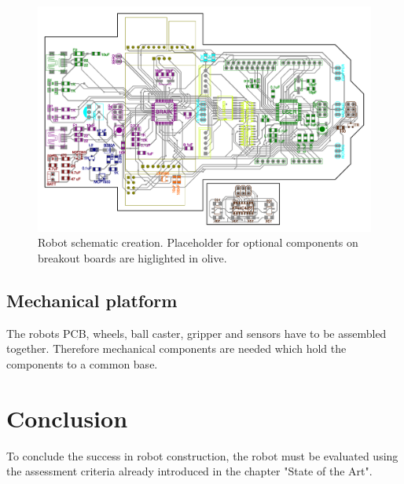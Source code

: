 \documentclass[11pt,a4paper]{article}
\begin{document}
\begin{figure}[H]
  \centering
  \includegraphics[width=\textwidth]{robot_schematic_optional.pdf}
  \caption{Robot schematic creation. Placeholder for optional components on breakout boards are higlighted in olive.}
\end{figure}



\subsection{Mechanical platform}
The robots PCB, wheels, ball caster, gripper and sensors have to be assembled together. Therefore mechanical components are needed which hold the components to a common base.



\section{Conclusion}
To conclude the success in robot construction, the robot must be evaluated using the assessment criteria already introduced in the chapter "State of the Art". 
\end{document}
